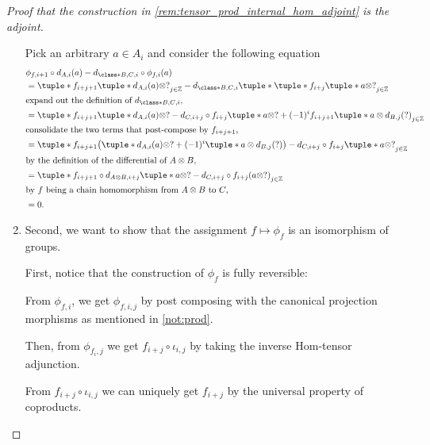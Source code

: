 \begin{proof}[Proof that the construction in \autoref{rem:tensor_prod_internal_hom_adjoint} is the adjoint]
\begin{enumerate}
{            %
            Pick an arbitrary \( a \in A_i \) and consider the following equation
            \begin{align*}
                &\phi_{f, i + 1} \circ d_{A, i}(a) - d_{\class*{B, C}, i} \circ \phi_{f, i}(a) \\
                &= \tuple*{ f_{i + j + 1}\tuple*{d_{A, i}(a) \otimes ?} }_{j \in \Zb}
                - d_{\class*{B, C}, i} \tuple*{ \tuple*{ f_{i + j}\tuple*{a \otimes ?} }_{j \in \Zb} } \\
                \intertext{expand out the definition of \( d_{\class*{B, C}, i} \),}
                &= \tuple*{ f_{i + j + 1}\tuple*{d_{A, i}(a) \otimes ?}
                - d_{C, i + j} \circ f_{i + j}\tuple*{a \otimes ?}
                + (-1)^i f_{i + j + 1}\tuple*{a \otimes d_{B, j}(?)} }_{j \in \Zb} \\
                \intertext{consolidate the two terms that post-compose by \( f_{i + j + 1} \),}
                &= \tuple*{ f_{i + j + 1}\bigl( \tuple*{d_{A, i}(a) \otimes ?}
                + (-1)^i\tuple*{ a \otimes d_{B, j}(?) } \bigr)
                - d_{C, i + j} \circ f_{i + j}\tuple*{ a \otimes ? } }_{j \in \Zb} \\
                \intertext{by the definition of the differential of \( A \otimes B \),}
                &= \tuple*{ f_{i + j + 1} \circ d_{A \otimes B, i + j} \tuple*{ a \otimes ? }
                - d_{C, i + j} \circ f_{i + j} ( a \otimes ? ) }_{j \in \Zb} \\
                \intertext{by \( f \) being a chain homomorphism from \( A \otimes B \) to \( C \),}
                &= 0.
            \end{align*}
        }
        \item {
            Second, we want to show that the assignment \( f \mapsto \phi_f \) is an isomorphism of groups.

            First, notice that the construction of \( \phi_f \) is fully reversible:

            From \( \phi_{f, i} \), we get \( \phi_{f, i, j} \) by post composing with the canonical projection morphisms as mentioned in \autoref{not:prod}.

            Then, from \( \phi_{f_i, j} \) we get \( f_{i + j} \circ \iota_{i, j} \) by taking the inverse Hom-tensor adjunction.

            From \( f_{i + j} \circ \iota_{i, j} \) we can uniquely get \( f_{i + j} \) by the universal property of coproducts.

}
\end{enumerate}
\end{proof}
